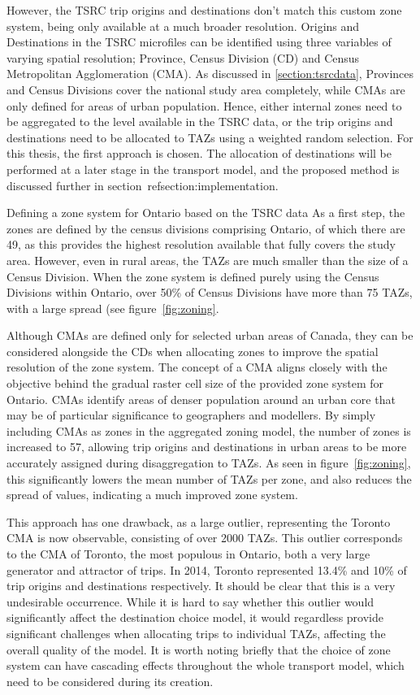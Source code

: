 However, the TSRC trip origins and destinations don't match this custom zone system, being only available at a much broader resolution. Origins and Destinations in the TSRC microfiles can be identified using three variables of varying spatial resolution; Province, Census Division (CD) and Census Metropolitan Agglomeration (CMA). As discussed in \ref{section:tsrcdata}, Provinces and Census Divisions cover the national study area completely, while CMAs are only defined for areas of urban population. Hence, either internal zones need to be aggregated to the level available in the TSRC data, or the trip origins and destinations need to be allocated to TAZs using a weighted random selection. For this thesis, the first approach is chosen. The allocation of destinations will be performed at a later stage in the transport model, and the proposed method is discussed further in section~ref{section:implementation}.


Defining a zone system for Ontario based on the TSRC data
As a first step, the  zones are defined by the census divisions comprising Ontario, of which there are 49, as this provides the highest resolution available that fully covers the study area. However, even in rural areas, the TAZs are much smaller than the size of a Census Division. When the zone system is defined purely using the Census Divisions within Ontario, over 50\% of Census Divisions have more than 75 TAZs, with a large spread (see figure~\ref{fig:zoning}. 

Although CMAs are defined only for selected urban areas of Canada, they can be considered alongside the CDs when allocating zones to improve the spatial resolution of the zone system. The concept of a CMA aligns closely with the objective behind the gradual raster cell size of the provided zone system for Ontario. CMAs identify areas of denser population around an urban core that may be of particular significance to geographers and modellers. By simply including CMAs as zones in the aggregated zoning model, the number of zones is increased to 57, allowing trip origins and destinations in urban areas to be more accurately assigned during disaggregation to TAZs. As seen in figure~\ref{fig:zoning}, this significantly lowers the mean number of TAZs per zone, and also reduces the spread of values, indicating a much improved zone system. 

This approach has one drawback, as a large outlier, representing the Toronto CMA is now observable, consisting of over 2000 TAZs. This outlier corresponds to the CMA of Toronto, the most populous in Ontario, both a very large generator and attractor of trips. In 2014, Toronto represented 13.4\% and 10\% of trip origins and destinations respectively. It should be clear that this is a very undesirable occurrence. While it is hard to say whether this outlier would significantly affect the destination choice model, it would regardless provide significant challenges when allocating trips to individual TAZs, affecting the overall quality of the model. It is worth noting briefly that the choice of zone system can have cascading effects throughout the whole transport model, which need to be considered during its creation.

